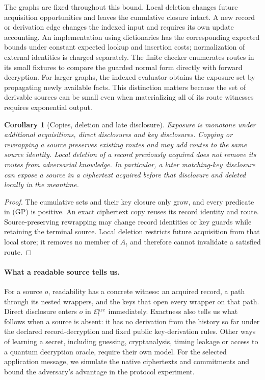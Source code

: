 \documentclass[pdflatex]{sn-jnl}
\theoremstyle{thmstyleone}
\newtheorem{corollary}[theorem]{Corollary}
\theoremstyle{thmstylethree}
\theoremstyle{thmstyletwo}
\begin{document}
The graphs are fixed throughout this bound. Local deletion changes future
acquisition opportunities and leaves the cumulative closure intact. A new
record or derivation edge changes the indexed input and requires its own
update accounting. An implementation using dictionaries has the
corresponding expected bounds under constant expected lookup and insertion
costs; normalization of external identities is charged separately.
The finite checker enumerates routes in its small fixtures to compare
the guarded normal form directly with forward decryption. For larger
graphs, the indexed evaluator obtains the exposure set by propagating
newly available facts. This distinction matters because the set of
derivable sources can be small even when materializing all of its route
witnesses requires exponential output.

\begin{corollary}[Copies, deletion and late disclosure]
\label{cor:guarded-history}
Exposure is monotone under additional acquisitions, direct disclosures
and key disclosures. Copying or rewrapping a source preserves existing
routes and may add routes to the same source identity.
Local deletion of a record previously acquired
does not remove its routes from adversarial knowledge.  In particular,
a later matching-key disclosure can expose a source in a ciphertext
acquired before that disclosure and deleted locally in the meantime.
\end{corollary}
\begin{proof}
The cumulative sets and their key closure only grow, and every predicate
in (GP) is positive. An exact ciphertext copy reuses its record identity
and route. Source-preserving rewrapping may change record identities or
key guards while retaining the terminal source. Local deletion
restricts future acquisition from that local store; it removes no member
of $A_t$ and therefore cannot invalidate a satisfied route.
\end{proof}

\paragraph{What a readable source tells us.}
For a source $o$, readability has a concrete witness: an acquired record,
a path through its nested wrappers, and the keys that open every wrapper
on that path. Direct disclosure enters $o$ in
$\mathcal E^{\rm src}_t$ immediately. Exactness also tells us what follows
when a source is absent: it has no derivation from the history so far
under the declared record-decryption and fixed public key-derivation rules.
Other ways of learning a secret, including guessing, cryptanalysis,
timing leakage or access to a quantum decryption oracle, require their
own model. For the selected application message, we simulate the native
ciphertexts and commitments and bound the adversary's advantage in the
protocol experiment.
\end{document}
